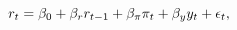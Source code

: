 \begin{equation} \label{eq:TaylorRule}
	r_{t} = \beta_{0} + \beta_{r} r_{t-1} + \beta_{\pi} \pi_{t} + \beta_{y} y_{t} + \epsilon_{t},
\end{equation}